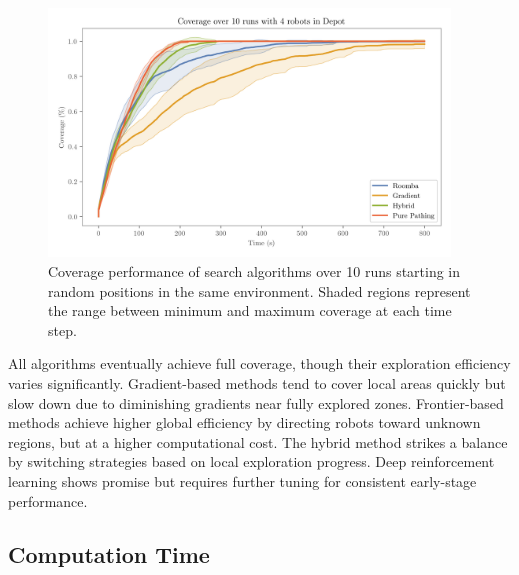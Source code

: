 \begin{figure}[H]
    \begin{center}
        \includegraphics[width=0.95\textwidth]{./figures/plots/benchmarks/coverage-over-10-runs-with-4-robots-in-depot.png}
    \end{center}
    \caption{Coverage performance of search algorithms over 10 runs starting in random positions in the same environment. Shaded regions represent the range between minimum and maximum coverage at each time step.}
    \label{fig:coverage-benchmark}
\end{figure}

All algorithms eventually achieve full coverage, though their exploration efficiency varies significantly. 
Gradient-based methods tend to cover local areas quickly but slow down due to diminishing gradients near fully explored zones. 
Frontier-based methods achieve higher global efficiency by directing robots toward unknown regions, but at a higher computational cost. The hybrid method strikes a balance by switching strategies based on local exploration progress. 
Deep reinforcement learning shows promise but requires further tuning for consistent early-stage performance.

\subsection{Computation Time}
